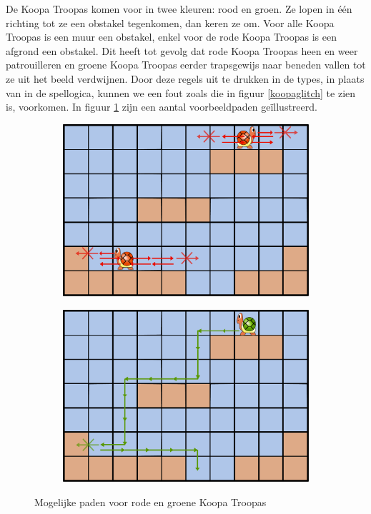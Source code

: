 De Koopa Troopas komen voor in twee kleuren: rood en groen. Ze lopen in één
richting tot ze een obstakel tegenkomen, dan keren ze om. Voor alle Koopa
Troopas is een muur een obstakel, enkel voor de rode Koopa Troopas is een
afgrond een obstakel. Dit heeft tot gevolg dat rode Koopa Troopas heen en weer
patrouilleren en groene Koopa Troopas eerder trapsgewijs naar beneden vallen
tot ze uit het beeld verdwijnen. Door deze regels uit te drukken in de types,
in plaats van in de spellogica, kunnen we een fout zoals die in figuur
\ref{koopaglitch} te zien is, voorkomen. In figuur \ref{kooparedgreen} zijn een
aantal voorbeeldpaden geïllustreerd.

\begin{figure}
  \centering
  \begin{subfigure}{0.49\textwidth}
    \includegraphics[width=\textwidth]{figures/koopatroopa-red}
  \end{subfigure}
  \begin{subfigure}{0.49\textwidth}
    \includegraphics[width=\textwidth]{figures/koopatroopa-green}
  \end{subfigure}
  \caption{Mogelijke paden voor rode en groene Koopa Troopas}
  \label{kooparedgreen}
\end{figure}


